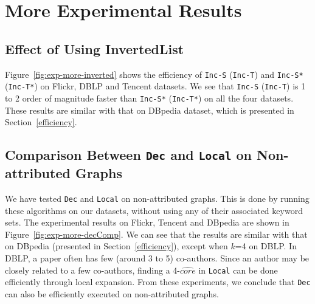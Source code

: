 \section{More Experimental Results}
\label{app:moreExp}

\subsection{Effect of Using InvertedList}
Figure~\ref{fig:exp-more-inverted} shows the efficiency of {\tt Inc-S} ({\tt Inc-T}) and {\tt Inc-S*} ({\tt Inc-T*}) on Flickr, DBLP and Tencent datasets. We see that {\tt Inc-S} ({\tt Inc-T}) is 1 to 2 order of magnitude faster than {\tt Inc-S*} ({\tt Inc-T*}) on all the four datasets. These results are similar with that on DBpedia dataset, which is presented in Section~\ref{efficiency}.

\subsection{Comparison Between {\tt Dec} and {\tt Local} on Non-attributed Graphs}
We have tested {\tt Dec} and {\tt Local} on non-attributed graphs. This is done by running these algorithms on our datasets, without using any of their associated keyword sets. The experimental results on Flickr, Tencent and DBpedia are shown in Figure~\ref{fig:exp-more-decComp}. We can see that the results are similar with that on DBpedia (presented in Section~\ref{efficiency}), except when $k$=4 on DBLP. In DBLP, a paper often has few (around 3 to 5) co-authors. Since an author may be closely related to a few co-authors, finding a 4-$\widehat {core}$ in {\tt Local} can be done efficiently through local expansion. From these experiments, we conclude that {\tt Dec} can also be efficiently executed on non-attributed graphs.


